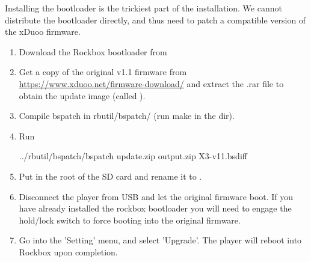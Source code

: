   Installing the bootloader is the trickiest part of the installation.
  We cannot distribute the bootloader directly, and thus need to patch a compatible
  version of the xDuoo firmware.

\begin{enumerate}

\item Download the Rockbox bootloader from

\item Get a copy of the original \playertype{} v1.1 firmware from
  \url{https://www.xduoo.net/firmware-download/} and extract the .rar file to obtain the
  update image (called ).

\item Compile bspatch in rbutil/bspatch/ (run make in the dir).

\item Run
\begin{code}
    ../rbutil/bspatch/bspatch update.zip output.zip X3-v11.bsdiff
\end{code}

\item Put  in the root of the SD card and rename it to .

\item Disconnect the player from USB and let the original firmware boot. If you have already installed the rockbox bootloader you will need to engage the hold/lock switch to force booting into the original firmware.

\item Go into the 'Setting' menu, and select 'Upgrade'. The player will reboot into Rockbox
  upon completion.

\end{enumerate}

